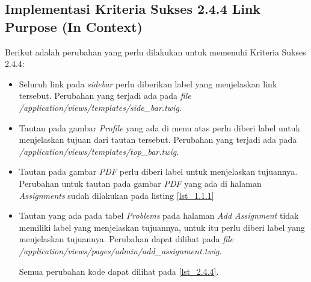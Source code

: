 \subsection{Implementasi Kriteria Sukses 2.4.4 Link Purpose (In Context)}
\label{subsec:implementasi_A_2.4.4}

Berikut adalah perubahan yang perlu dilakukan untuk memenuhi Kriteria Sukses 2.4.4:

\begin{itemize}
	\item Seluruh link pada \textit{sidebar} perlu diberikan label yang menjelaskan link tersebut. Perubahan yang terjadi ada pada \textit{file} \textit{/application/views/templates/side\_bar.twig}.

	\item Tautan pada gambar \textit{Profile} yang ada di menu atas perlu diberi label untuk menjelaskan tujuan dari tautan tersebut. Perubahan yang terjadi ada pada \textit{/application/views/templates/top\_bar.twig}.

	\item Tautan pada gambar \textit{PDF} perlu diberi label untuk menjelaskan tujuannya. Perubahan untuk tautan pada gambar \textit{PDF} yang ada di halaman \textit{Assignments} sudah dilakukan pada listing \ref{lst_1.1.1}
	
	\item Tautan yang ada pada tabel \textit{Problems} pada halaman \textit{Add Assignment} tidak memiliki label yang menjelaskan tujuannya, untuk itu perlu diberi label yang menjelaskan tujuannya. Perubahan dapat dilihat pada \textit{file} \textit{/application/views/pages/admin/add\_assignment.twig}.
	
	Semua perubahan kode dapat dilihat pada \ref{lst_2.4.4}.
	

\end{itemize}
